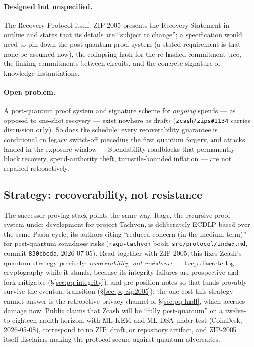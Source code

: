 \documentclass[11pt,a4paper]{article}
\theoremstyle{definition}
\begin{document}
\paragraph{Designed but unspecified.} The Recovery Protocol itself. ZIP-2005
presents the Recovery Statement in outline and states that its details are
``subject to change''; a specification would need to pin down the post-quantum
proof system (a stated requirement is that none be assumed now), the
collapsing hash for the re-hashed commitment tree, the linking commitments
between circuits, and the concrete signature-of-knowledge instantiations.

\paragraph{Open problem.} A post-quantum proof system and signature scheme for
\emph{ongoing} spends --- as opposed to one-shot recovery --- exist nowhere as
drafts (\texttt{zcash/zips\#1134} carries discussion only). So does the
schedule: every recoverability guarantee is conditional on legacy switch-off
preceding the first quantum forgery, and attacks landed in the exposure window
--- Spendability roadblocks that permanently block recovery, spend-authority
theft, turnstile-bounded inflation --- are not repaired retroactively.

\subsection{Strategy: recoverability, not resistance}\label{sec:pq-strategy}

The successor proving stack points the same way. Ragu, the recursive proof
system under development for project Tachyon, is deliberately ECDLP-based over
the same Pasta cycle, its authors citing ``reduced concern (in the medium
term)'' for post-quantum soundness risks (\texttt{ragu-tachyon} book,
\texttt{src/protocol/index.md}, commit \texttt{830bbcda}, 2026-07-05). Read
together with ZIP-2005, this fixes Zcash's quantum strategy precisely:
\emph{recoverability, not resistance} --- keep discrete-log cryptography while
it stands, because its integrity failures are prospective and fork-mitigable
(\S\ref{sec:pq-integrity}), and pre-position notes so that funds provably
survive the eventual transition (\S\ref{sec:pq-zip2005}); the one cost this
strategy cannot answer is the retroactive privacy channel of
\S\ref{sec:pq-hndl}, which accrues damage now. Public claims that Zcash will
be ``fully post-quantum'' on a twelve-to-eighteen-month horizon, with ML-KEM
and ML-DSA under test (CoinDesk, 2026-05-08), correspond to no ZIP, draft, or
repository artifact, and ZIP-2005 itself disclaims making the protocol secure
against quantum adversaries.
\end{document}
